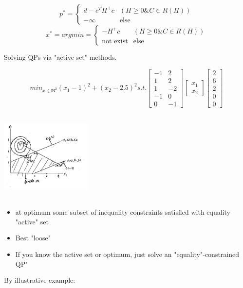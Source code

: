\begin{equation}
p^* = \left\{
\begin{array}{lr}
d - c^TH^+c &(H\geq 0 \& C\in R(H))  \\
-\infty & \text{else}
\end{array}
\right.
\end{equation}
\begin{equation}
x^* = argmin = \left\{
\begin{array}{lr}
-H^+c &(H\geq 0 \& C\in R(H)) \\
\text{not exist} & \text{else}
\end{array}
\right.
\end{equation}


Solving QPs via "active set" methods.

\begin{equation}
min_{x\in \Re^2}(x_1 - 1)^2 + (x_2 - 2.5)^2 s.t. 
\begin{bmatrix}
-1&2\\
1&2\\
1&-2\\
-1&0\\
0&-1
\end{bmatrix}\begin{bmatrix}
x_1\\
x_2
\end{bmatrix}\begin{bmatrix}
2\\
6\\
2\\
0\\
0
\end{bmatrix}
\end{equation}

\begin{marginfigure}
	\centering
	\includegraphics[width=1.8in,height=1.8in]{figures/ch07/figure1021_1.png}
\end{marginfigure}

\begin{itemize}
	\item at optimum some subset of inequality constraints satisfied with equality "active" set
	
	\item Best "loose"
	
	\item If you know the active set or optimum, just solve an "equality"-constrained QP"
\end{itemize}
By illustrative example:

